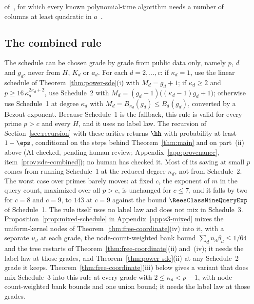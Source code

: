 \begin{remark}
of~\cite[Definition~6.1]{GoosKamathSotirakiZampetakis2020}, for which every known polynomial-time algorithm needs a number of columns at least quadratic in $a$~\cite{KothariODonnellWu2026,KothariMetgerODonnellShuttyWu2026}.
\end{remark}

\subsection{The combined rule}
\label{sec:combined-rule}

\begin{remark}
\label{rem:combined-schedule}
The schedule can be chosen grade by grade from public data only, namely $p$, $d$ and $g_d$, never from $H$, $K_d$ or $a_d$. For each $d = 2,\dots,c$: if $\kappa_d = 1$, use the linear schedule of Theorem~\ref{thm:power-sde}(i) with $M_d = g_d+1$; if $\kappa_d \ge 2$ and $p \ge 16\,\kappa_d^{2\kappa_d+2}$, use Schedule~2 with $M_d = (g_d+1)\bigl((\kappa_d-1)g_d+1\bigr)$; otherwise use Schedule~1 at degree $\kappa_d$ with $M_d = B_{\kappa_d}(g_d) \le B_d(g_d)$, converted by a Bezout exponent. Because Schedule~1 is the fallback, this rule is valid for every prime $p > c$ and every $H$, and it uses no label law. The recursion of Section~\ref{sec:recursion} with these arities returns $\hh$ with probability at least $1-\eps$, conditional on the steps behind Theorem~\ref{thm:main} and on part~(ii) above (AI-checked, pending human review; Appendix~\ref{app:provenance}, item~\ref{prov:sde-combined}); no human has checked it. Most of its saving at small $p$ comes from running Schedule~1 at the reduced degree $\kappa_d$, not from Schedule~2. The worst case over primes barely moves: at fixed $c$, the exponent of $m$ in the query count, maximized over all $p > c$, is unchanged for $c \le 7$, and it falls by two for $c = 8$ and $c = 9$, to $143$ at $c = 9$ against the bound $\ReesClassNineQueryExp$ of Schedule~1. The rule itself uses no label law and does not mix in Schedule~3. Proposition~\ref{prop:mixed-schedule} in Appendix~\ref{app:s3-mixed} mixes the uniform-kernel nodes of Theorem~\ref{thm:free-coordinate}(iv) into it, with a separate $u_d$ at each grade, the node-count-weighted bank bound $\sum_d n_d\beta_d \le 1/64$ and the tree restarts of Theorem~\ref{thm:free-coordinate}(ii) and~(iv); it needs the label law at those grades, and Theorem~\ref{thm:power-sde}(ii) at any Schedule~2 grade it keeps. Theorem~\ref{thm:free-coordinate}(iii) below gives a variant that does mix Schedule~3 into this rule at every grade with $2 \le \kappa_d < p-1$, with node-count-weighted bank bounds and one union bound; it needs the label law at those grades.


\end{remark}

